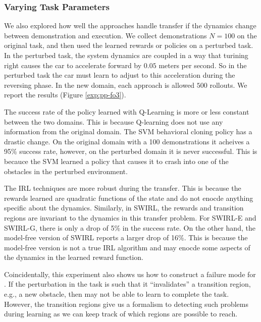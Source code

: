 \subsubsection{Varying Task Parameters}
We also explored how well the approaches handle transfer if the dynamics change between demonstration and execution.
We collect demonstrations $N=100$ on the original task, and then used the learned rewards or policies on a perturbed task.
In the perturbed task, the system dynamics are coupled in a way that turining right causes the car to accelerate forward by $0.05$ meters per second.
So in the perturbed task the car must learn to adjust to this acceleration during the reversing phase.
In the new domain, each approach is allowed $500$ rollouts. 
We report the results (Figure \ref{exp:pp-fo3}).

The success rate of the policy learned with Q-Learning is more or less constant between the two domains.
This is because Q-learning does not use any information from the original domain.
The SVM behavioral cloning policy has a drastic change.
On the original domain with a 100 demonstrations it acheives a 95\% success rate, however, on the perturbed domain it is never successful.
This is becauce the SVM learned a policy that causes it to crash into one of the obstacles in the perturbed environment.

The IRL techniques are more robust during the transfer.
This is because the rewards learned are quadratic functions of the state and do not enocde anything specific about the dynamics.
Similarly, in SWIRL, the rewards and transition regions are invariant to the dynamics in this transfer problem.
For SWIRL-E and SWIRL-G, there is only a drop of 5\% in the success rate.
On the other hand, the model-free version of SWIRL reports a larger drop of 16\%.
This is because the model-free version is not a true IRL algorithm and may enocde some aspects of the dynamics in the learned reward function.

Coincidentally, this experiment also shows us how to construct a failure mode for \hirl.
If the perturbation in the task is such that it ``invalidates'' a transition region, e.g., a new obstacle, then \hirl may not be able to learn to complete the task.
However, the transition regions give us a formalism to detecting such problems during learning as we can keep track of which regions are possible to reach.



